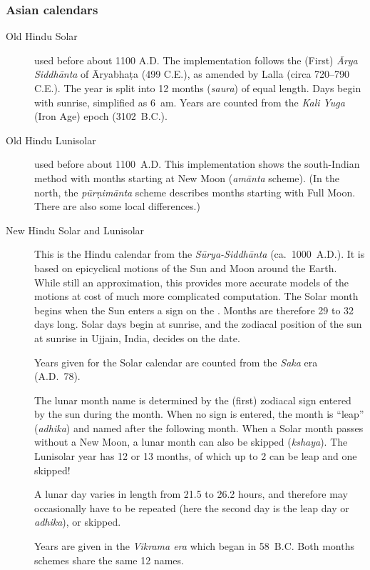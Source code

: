 \subsubsection{Asian calendars}
\begin{description}
\item[Old Hindu Solar] used before about 1100 A.D. The implementation
  follows the (First) \emph{\=Arya Siddh\=anta} of \=Aryabha\d{t}a
  (499 C.E.), as amended by Lalla (circa 720--790 C.E.).  The year is
  split into 12 months (\emph{saura}) of equal length.  Days begin
  with sunrise, simplified as 6~am. Years are counted from the
  \emph{Kali Yuga} (Iron Age) epoch (3102~B.C.).
\item[Old Hindu Lunisolar] used before about 1100~A.D. 
  This implementation shows the south-Indian method 
  with months starting at New Moon (\emph{am\=anta} scheme). 
  (In the north, the \emph{p\=ur\d{n}im\=anta} scheme describes months 
  starting with Full Moon. There are also some local differences.)
\item[New Hindu Solar and Lunisolar] This is the Hindu
  calendar from the \emph{S\=urya-Siddh\=anta}
  (ca.~1000~A.D.). It is based on epicyclical motions of the Sun and
  Moon around the Earth. While still an approximation, this provides
  more accurate models of the motions at cost of much more complicated
  computation.  The Solar month begins when the Sun enters a sign on
  the . Months are
  therefore 29 to 32 days long. Solar days begin at sunrise, and the
  zodiacal position of the sun at sunrise in Ujjain, India, decides on
  the date.

  Years given for the Solar calendar are counted from the \emph{Saka}
  era (A.D.~78).

  The lunar month name is determined by the (first) zodiacal sign
  entered by the sun during the month. When no sign is entered, the
  month is ``leap'' (\emph{adhika}) and named after the following
  month. When a Solar month passes without a New Moon, a lunar month
  can also be skipped (\emph{kshaya}).  The Lunisolar year has 12 or
  13 months, of which up to 2 can be leap and one skipped!

  A lunar day varies in length from 21.5 to 26.2 hours, and therefore
  may occasionally have to be repeated (here the second day is the
  leap day or \emph{adhika}), or skipped.

  Years are given in the \emph{Vikrama era} which began in
  58~B.C. Both months schemes share the same 12 names.


\end{description}
